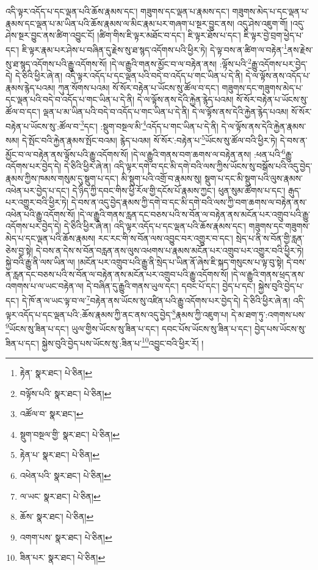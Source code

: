 འདི་ལྟར་འདོད་པ་དང་ལྡན་པའི་ཆོས་རྣམས་དང་། གཟུགས་དང་ལྡན་པ་རྣམས་དང་། གཟུགས་མེད་པ་དང་ལྡན་པ་རྣམས་དང་ལྡན་པ་མ་ཡིན་པའི་ཆོས་རྣམས་ལ་མིང་རྣམ་པར་གཞག་པ་སྔར་བྱུང་ནས། འདུ་ཤེས་འཇུག་གོ། །འདུ་ཤེས་སྔར་བྱུང་ནས་ཚིག་འབྱུང་ངོ། །ཚིག་གིས་ཇི་ལྟར་མཐོང་བ་དང་། ཇི་ལྟར་ཐོས་པ་དང་། ཇི་ལྟར་བྱེ་བྲག་ཕྱེད་པ་དང་། ཇི་ལྟར་རྣམ་པར་ཤེས་པ་བཞིན་དུ་རྗེས་སུ་ཐ་སྙད་འདོགས་པའི་ཕྱིར་ཏེ། དེ་ལྟ་བས་ན་ཚིག་ལ་བརྟེན་\footnote{རྟེན་  སྣར་ཐང་།  པེ་ཅིན། }ནས་རྗེས་སུ་ཐ་སྙད་འདོགས་པའི་རྒྱུ་འདོགས་སོ། །དེ་ལ་རྒྱུའི་གནས་མྱོང་བ་ལ་བརྟེན་ནས། :ལྟོས་པའི་\footnote{བལྟོས་པའི་  སྣར་ཐང་།  པེ་ཅིན། }རྒྱུ་འདོགས་པར་བྱེད་དེ། དེ་ཅིའི་ཕྱིར་ཞེ་ན། འདི་ལྟར་འདོད་པ་དང་ལྡན་པའི་བདེ་བ་འདོད་པ་གང་ཡིན་པ་དེ་ནི། དེ་ལ་ལྟོས་ནས་འདོད་པ་རྣམས་རྙེད་པའམ། ཀུན་སོགས་པའམ། སོ་སོར་བརྟེན་པ་ཡོངས་སུ་ཚོལ་བ་དང་། གཟུགས་དང་གཟུགས་མེད་པ་དང་ལྡན་པའི་བདེ་བ་འདོད་པ་གང་ཡིན་པ་དེ་ནི། དེ་ལ་ལྟོས་ནས་དེའི་རྐྱེན་རྙེད་པའམ། སོ་སོར་བརྟེན་པ་ཡོངས་སུ་ཚོལ་བ་དང་། ལྡན་པ་མ་ཡིན་པའི་བདེ་བ་འདོད་པ་གང་ཡིན་པ་དེ་ནི། དེ་ལ་ལྟོས་ནས་དེའི་རྐྱེན་རྙེད་པའམ། སོ་སོར་བརྟེན་པ་ཡོངས་སུ་:ཚོལ་བ་\footnote{འཚོལ་བ་  སྣར་ཐང་། }དང་། :སྡུག་བསྔལ་མི་\footnote{སྡུག་བསྔལ་གྱི་  སྣར་ཐང་།  པེ་ཅིན། }འདོད་པ་གང་ཡིན་པ་དེ་ནི། དེ་ལ་ལྟོས་ནས་དེའི་རྐྱེན་རྣམས་སམ། དེ་སྤོང་བའི་རྐྱེན་རྣམས་སྤོང་བའམ། རྙེད་པའམ། སོ་སོར་:བརྟེན་པ་\footnote{རྟེན་པ་  སྣར་ཐང་།  པེ་ཅིན། }ཡོངས་སུ་ཚོལ་བའི་ཕྱིར་ཏེ། དེ་བས་ན་མྱོང་བ་ལ་བརྟེན་ནས་ལྟོས་པའི་རྒྱུ་འདོགས་སོ། །དེ་ལ་རྒྱུའི་གནས་བག་ཆགས་ལ་བརྟེན་ནས། :ཕན་པའི་\footnote{འཕེན་པའི་  སྣར་ཐང་།  པེ་ཅིན། }རྒྱུ་འདོགས་པར་བྱེད་དེ། དེ་ཅིའི་ཕྱིར་ཞེ་ན། འདི་ལྟར་དགེ་བ་དང་མི་དགེ་བའི་ལས་ཀྱིས་ཡོངས་སུ་བསྒོས་པའི་འདུ་བྱེད་རྣམས་ཀྱིས་ཁམས་གསུམ་དུ་སྡུག་པ་དང་། མི་སྡུག་པའི་འགྲོ་བ་རྣམས་སུ། སྡུག་པ་དང་མི་སྡུག་པའི་ལུས་རྣམས་འཕེན་པར་བྱེད་པ་དང་། དེ་ཉིད་ཀྱི་དབང་གིས་ཕྱི་རོལ་གྱི་དངོས་པོ་རྣམས་ཀྱང་། ཕུན་སུམ་ཚོགས་པ་དང་། རྒུད་པར་འགྱུར་བའི་ཕྱིར་ཏེ། དེ་བས་ན་འདུ་བྱེད་རྣམས་ཀྱི་དགེ་བ་དང་མི་དགེ་བའི་ལས་ཀྱི་བག་ཆགས་ལ་བརྟེན་ནས་འཕེན་པའི་རྒྱུ་འདོགས་སོ། །དེ་ལ་རྒྱུའི་གནས་རླན་དང་བཅས་པའི་ས་བོན་ལ་བརྟེན་ནས་མངོན་པར་འགྲུབ་པའི་རྒྱུ་འདོགས་པར་བྱེད་དེ། དེ་ཅིའི་ཕྱིར་ཞེ་ན། འདི་ལྟར་འདོད་པ་དང་ལྡན་པའི་ཆོས་རྣམས་དང་། གཟུགས་དང་གཟུགས་མེད་པ་དང་ལྡན་པའི་ཆོས་རྣམས། རང་རང་གི་ས་བོན་ལས་འབྱུང་བར་འགྱུར་བ་དང་། སྲེད་པ་ནི་ས་བོན་གྱི་རླན་ཅེས་བྱ་སྟེ། དེ་བས་ན་དེས་ས་བོན་བརླན་ནས་ལུས་འཕགས་པ་རྣམས་མངོན་པར་འགྲུབ་པར་འགྱུར་བའི་ཕྱིར་ཏེ། སྐྱེ་བའི་རྒྱུ་ནི་ལས་ཡིན་ལ། །མངོན་པར་འགྲུབ་པའི་རྒྱུ་ནི་སྲེད་པ་ཡིན་ནོ་ཞེས་ཇི་སྐད་གསུངས་པ་ལྟ་བུ་སྟེ། དེ་བས་ན་རླན་དང་བཅས་པའི་ས་བོན་ལ་བརྟེན་ནས་མངོན་པར་འགྲུབ་པའི་རྒྱུ་འདོགས་སོ། །དེ་ལ་རྒྱུའི་གནས་ཕྲད་ནས་འགགས་པ་ལ་ཡང་བརྟེན་ལ། དེ་བཞིན་དུ་རྒྱུའི་གནས་ཡུལ་དང་། དབང་པོ་དང་། བྱེད་པ་དང་། སྐྱེས་བུའི་བྱེད་པ་དང་། དེ་ཁོ་ན་ལ་ཡང་ལྟ་བ་ལ་\footnote{ལ་ཡང་  སྣར་ཐང་།  པེ་ཅིན། }བརྟེན་ནས་ཡོངས་སུ་འཛིན་པའི་རྒྱུ་འདོགས་པར་བྱེད་དེ། དེ་ཅིའི་ཕྱིར་ཞེ་ན། འདི་ལྟར་འདོད་པ་དང་ལྡན་པའི་:ཆོས་རྣམས་ཀྱི་ནང་ནས་འདུ་བྱེད་\footnote{ཆོས་  སྣར་ཐང་།  པེ་ཅིན། }རྣམས་ཀྱི་འཇུག་པ། དེ་མ་ཐག་ཏུ་:འགགས་པས་\footnote{འགག་པས་  སྣར་ཐང་།  པེ་ཅིན། }ཡོངས་སུ་ཟིན་པ་དང་། ཡུལ་གྱིས་ཡོངས་སུ་ཟིན་པ་དང་། དབང་པོས་ཡོངས་སུ་ཟིན་པ་དང་། བྱེད་པས་ཡོངས་སུ་ཟིན་པ་དང་། སྐྱེས་བུའི་བྱེད་པས་ཡོངས་སུ་:ཟིན་པ་\footnote{ཟིན་པར་  སྣར་ཐང་།  པེ་ཅིན། }འབྱུང་བའི་ཕྱིར་རོ། །
